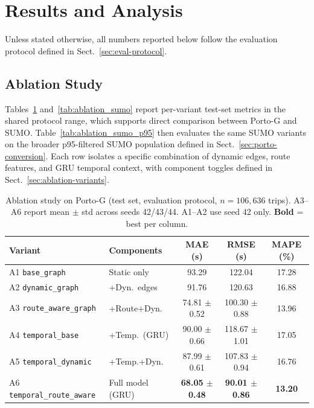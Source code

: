 \section{Results and Analysis}\label{sec5}

Unless stated otherwise, all numbers reported below follow the evaluation protocol defined in Sect.~\ref{sec:eval-protocol}.

\subsection{Ablation Study}\label{sec5:ablation}

Tables~\ref{tab:ablation_porto} and~\ref{tab:ablation_sumo} report per-variant test-set metrics in the shared protocol range, which supports direct comparison between Porto-G and SUMO. Table~\ref{tab:ablation_sumo_p95} then evaluates the same SUMO variants on the broader p95-filtered SUMO population defined in Sect.~\ref{sec:porto-conversion}. Each row isolates a specific combination of dynamic edges, route features, and GRU temporal context, with component toggles defined in Sect.~\ref{sec:ablation-variants}.

\begin{table}[t]
    \centering
    \caption{Ablation study on Porto-G (test set, evaluation protocol, $n{=}106{,}636$ trips). A3--A6 report mean $\pm$ std across seeds 42/43/44. A1--A2 use seed 42 only. \textbf{Bold} = best per column.}
    \label{tab:ablation_porto}
    {\footnotesize\setlength{\tabcolsep}{4pt}%
    \begin{tabular}{@{}llccc@{}}
        \toprule
        \textbf{Variant} & \textbf{Components} & \textbf{MAE (s)} & \textbf{RMSE (s)} & \textbf{MAPE (\%)} \\
        \midrule
        A1 \texttt{base\_graph}            & Static only         & 93.29 & 122.04 & 17.28 \\
        A2 \texttt{dynamic\_graph}         & +Dyn.\ edges        & 91.76 & 120.63 & 16.88 \\
        A3 \texttt{route\_aware\_graph}    & +Route+Dyn.\        & 74.81 $\pm$ 0.52 & 100.30 $\pm$ 0.88 & 13.96 \\
        A4 \texttt{temporal\_base}         & +Temp.\ (GRU)       & 90.00 $\pm$ 0.66 & 118.67 $\pm$ 1.01 & 17.05 \\
        A5 \texttt{temporal\_dynamic}      & +Temp.+Dyn.\        & 87.99 $\pm$ 0.61 & 107.83 $\pm$ 0.94 & 16.76 \\
        A6 \texttt{temporal\_route\_aware} & Full model (GRU)    & \textbf{68.05 $\pm$ 0.48} & \textbf{90.01 $\pm$ 0.86} & \textbf{13.20} \\
        \bottomrule
    \end{tabular}}%
\end{table}

